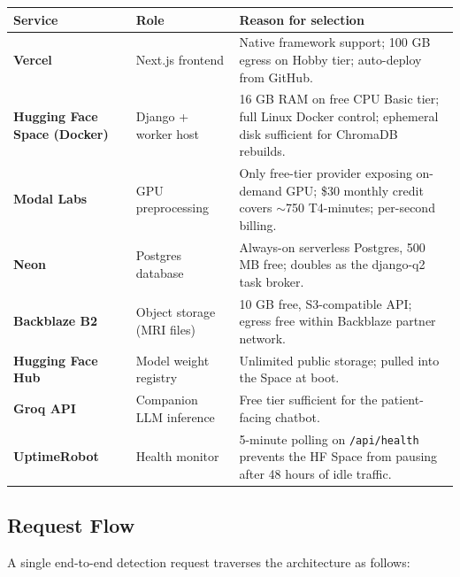 \documentclass[11pt, a4paper]{article}
\begin{document}
\begin{center}
\small
\begin{tabular}{>{\bfseries}p{3.0cm} p{4.0cm} p{8.6cm}}
\toprule
Service & Role & Reason for selection \\
\midrule
Vercel & Next.js frontend & Native framework support; 100 GB egress on Hobby tier; auto-deploy from GitHub. \\
Hugging Face Space (Docker) & Django + worker host & 16 GB RAM on free CPU Basic tier; full Linux Docker control; ephemeral disk sufficient for ChromaDB rebuilds. \\
Modal Labs & GPU preprocessing & Only free-tier provider exposing on-demand GPU; \$30 monthly credit covers $\sim$750 T4-minutes; per-second billing. \\
Neon & Postgres database & Always-on serverless Postgres, 500 MB free; doubles as the django-q2 task broker. \\
Backblaze B2 & Object storage (MRI files) & 10 GB free, S3-compatible API; egress free within Backblaze partner network. \\
Hugging Face Hub & Model weight registry & Unlimited public storage; pulled into the Space at boot. \\
Groq API & Companion LLM inference & Free tier sufficient for the patient-facing chatbot. \\
UptimeRobot & Health monitor & 5-minute polling on \texttt{/api/health} prevents the HF Space from pausing after 48 hours of idle traffic. \\
\bottomrule
\end{tabular}
\end{center}

\subsection{Request Flow}

A single end-to-end detection request traverses the architecture as follows:
\end{document}
